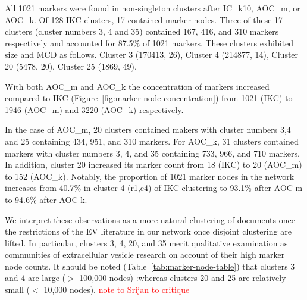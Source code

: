 \documentclass[12pt, oneside]{article}   	%
\begin{document}
All 1021 markers were found in non-singleton clusters after IC\_k10, AOC\_m, or AOC\_k. Of 128 IKC clusters, 17 contained marker nodes. Three of these 17 clusters (cluster numbers 3, 4 and 35) contained 167, 416, and 310 markers respectively and accounted for 87.5\% of 1021 markers. These clusters exhibited size and MCD as follows. Cluster 3 (170413, 26), Cluster 4 (214877, 14), Cluster 20 (5478, 20), Cluster 25 (1869, 49). 

With both AOC\_m and AOC\_k the concentration of markers increased compared to IKC (Figure~\ref{fig:marker-node-concentration}) from 1021 (IKC) to 1946 (AOC\_m) and 3220 (AOC\_k) respectively.

In the case of AOC\_m, 20 clusters contained makers with cluster numbers 3,4 and 25 containing 434, 951, and 310 markers. For AOC\_k, 31 clusters contained markers with cluster numbers 3, 4, and 35 containing 733, 966, and 710 markers. In addition, cluster 20 increased its marker count from 18 (IKC) to 20 (AOC\_m) to 152 (AOC\_k). Notably, the proportion of 1021 marker nodes in the network increases from 40.7\% in cluster 4 (r1,c4) of IKC clustering to 93.1\% after AOC m to 94.6\% after AOC k. 

We interpret these observations as a more natural clustering of documents once the restrictions of the EV literature in our network once disjoint clustering are lifted. In particular, clusters 3, 4, 20, and 35 merit qualitative examination as communities of extracellular vesicle research on account of their high marker node counts. It should be noted (Table~\ref{tab:marker-node-table}) that clusters 3 and 4 are large ($>$ 100,000 nodes) :whereas clusters 20 and 25 are relatively small ($<$ 10,000 nodes). \textcolor{red}{note to Srijan to critique}
\end{document}
